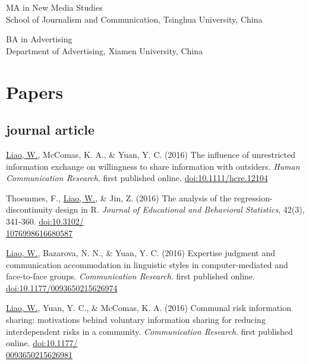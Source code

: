 \documentclass[11pt, letterpaper]{article} %
\newcommand{\years}[1]{\leavevmode\marginnote{\scriptsize #1}} %
\begin{document}
\years{2009-2012}\textsc{MA} in New Media Studies\\
    \textsf{School of Journalism and Communication, Tsinghua University, China}

\years{2005-2009}\textsc{BA} in Advertising\\
    \textsf{Department of Advertising, Xiamen University, China}





\section*{Papers}

\subsection*{journal article}

\begin{hangparas}{.25in}{1}
\underline{Liao, W.}, \years{2016}  McComas, K. A., \& Yuan, Y. C. (2016) The influence of unrestricted information exchange on willingness to share information with outsiders. \textsl{Human Communication Research}. first published online. \href{http://doi.org/10.1111/hcre.12104}{doi:10.1111/hcre.12104} 

    Thoemmes, F., \underline{Liao, W.}, \& Jin, Z. (2016) The analysis of the regression-discontinuity design in R. \textsl{Journal of Educational and Behavioral Statistics}, 42(3), 341-360. \href{http://doi.org/10.3102/1076998616680587}{doi:10.3102/\\1076998616680587}

    \underline{Liao, W.}, Bazarova, N. N., \& Yuan, Y. C. (2016) Expertise judgment and communication accommodation in linguistic styles in computer-mediated and face-to-face groups. \textsl{Communication Research}. first published online. \href{http://doi.org/10.1177/0093650215626974}{doi:10.1177/0093650215626974}

    \underline{Liao, W.}, Yuan, Y. C., \& McComas, K. A. (2016) Communal risk information sharing: motivations behind voluntary information sharing for reducing interdependent risks in a community. \textsl{Communication Research}. first published online. \href{http://doi.org/10.1177/0093650215626981}{doi:10.1177/\\0093650215626981}
\end{hangparas}
\end{document}
